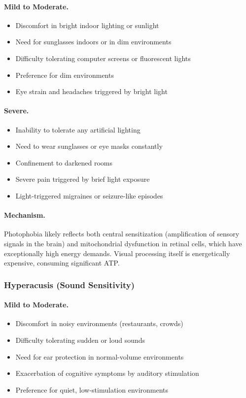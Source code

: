 \paragraph{Mild to Moderate.}
\begin{itemize}
    \item Discomfort in bright indoor lighting or sunlight
    \item Need for sunglasses indoors or in dim environments
    \item Difficulty tolerating computer screens or fluorescent lights
    \item Preference for dim environments
    \item Eye strain and headaches triggered by bright light
\end{itemize}

\paragraph{Severe.}
\begin{itemize}
    \item Inability to tolerate any artificial lighting
    \item Need to wear sunglasses or eye masks constantly
    \item Confinement to darkened rooms
    \item Severe pain triggered by brief light exposure
    \item Light-triggered migraines or seizure-like episodes
\end{itemize}

\paragraph{Mechanism.}
Photophobia likely reflects both central sensitization (amplification of sensory signals in the brain) and mitochondrial dysfunction in retinal cells, which have exceptionally high energy demands. Visual processing itself is energetically expensive, consuming significant ATP.

\subsubsection{Hyperacusis (Sound Sensitivity)}

\paragraph{Mild to Moderate.}
\begin{itemize}
    \item Discomfort in noisy environments (restaurants, crowds)
    \item Difficulty tolerating sudden or loud sounds
    \item Need for ear protection in normal-volume environments
    \item Exacerbation of cognitive symptoms by auditory stimulation
    \item Preference for quiet, low-stimulation environments
\end{itemize}

